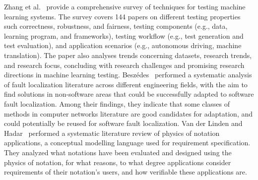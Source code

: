 Zhang et al.~\cite{Zhang-TSE} provide a comprehensive 
survey of techniques for testing machine learning systems. 
The survey covers 144 papers on different 
testing properties such correctness, robustness, 
and fairness, testing components 
(e.g., data, learning program, and frameworks), 
testing workflow (e.g., test generation and 
test evaluation), and application scenarios 
(e.g., autonomous driving, machine translation). 
The paper also analyses trends concerning datasets, 
research trends, and research focus, 
concluding with research challenges and promising 
research directions in machine learning testing.
%
Besz\'{e}des~\cite{Beszdes2019InterdisciplinarySO} 
performed a systematic analysis of fault localization 
literature across different engineering fields, 
with the aim to find solutions in non-software areas 
that could be successfully adapted to software fault 
localization. Among their findings, they indicate that 
some classes of methods in computer networks literature are good 
candidates for adaptation, and could potentially be 
reused for software fault localization. 
%
Van der Linden and Hadar~\cite{8283537} performed a 
systematic literature review of physics of notation applications, 
a conceptual modelling language used for  
requirement specification. They analyzed what 
notations have been evaluated and designed using 
the physics of notation, for what reasons, 
to what degree applications consider requirements 
of their notation's users, and how verifiable these 
applications are. 
%


